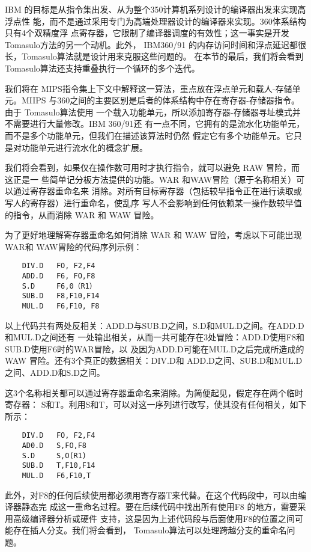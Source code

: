 IBM 的目标是从指令集出发、从为整个350计算机系列设计的编译器出发来实现高浮点性
能，而不是通过采用专门为高端处理器设计的编译器来实现。360体系结构只有4个双精度浮
点寄存器，它限制了编译器调度的有效性；这一事实是开发 Tomasulo方法的另一个动机。此外，
IBM360/91 的内存访问时间和浮点延迟都很长，Tomasulo算法就是设计用来克服这些问题的。
在本节的最后，我们将会看到 Tomasulo算法还支持重叠执行一个循环的多个迭代。

我们将在 MIPS指令集上下文中解释这一算法，重点放在浮点单元和载人-存储单元。MIIPS
与360之间的主要区别是后者的体系结构中存在寄存器-存储器指令。由于 Tomasulo算法使用
一个载入功能单元，所以添加寄存器-存储器寻址模式并不需要进行大量修改。IBM 360/91还
有一点不同，它拥有的是流水化功能单元，而不是多个功能单元，但我们在描述该算法时仍然
假定它有多个功能单元。它只是对功能单元进行流水化的概念扩展。

我们将会看到，如果仅在操作数可用时才执行指令，就可以避免 RAW 冒险，而这正是一
些简单记分板方法提供的功能。WAR 和WAW冒险（源于名称相关）可以通过寄存器重命名来
消除。对所有目标寄存器（包括较早指令正在进行读取或写人的寄存器）进行重命名，使乱序
写人不会影响到任何依赖某一操作数较早值的指令，从而消除 WAR 和 WAW 冒险。

为了更好地理解寄存器重命名如何消除 WAR 和 WAW 冒险，考虑以下可能出现 WAR和
WAW胃险的代码序列示例：

\begin{verbatim}
    DIV.D   FO, F2,F4
    ADD.D   F6, FO,F8
    S.D     F6,0（R1）
    SUB.D   F8,F10,F14
    MUL.D   F6,F10, F8
\end{verbatim}

以上代码共有两处反相关：ADD.D与SUB.D之间，S.D和MUL.D之间。在ADD.D和MUL.D之间还有
一处输出相关，从而一共可能存在3处冒险：ADD.D使用F8和SUB.D使用F6时的WAR冒险，以
及因为ADD.D可能在MUL.D之后完成所造成的WAW 冒险。还有3个真正的数据相关：DIV.D和
ADD.D之间、SUB.D和MUL.D之间、ADD.D和S.D之间。

这3个名称相关都可以通过寄存器重命名来消除。为简便起见，假定存在两个临时寄存器：
S和T。利用S和T，可以对这一序列进行改写，使其没有任何相关，如下所示：

\begin{verbatim}
    DIV.D   FO, F2,F4
    AD0.D   S,FO,F8
    S.D     S,O(R1)
    SUB.D   T,F10,F14
    MUL.D   F6,F10,T
\end{verbatim}

此外，对F8的任何后续使用都必须用寄存器T来代替。在这个代码段中，可以由编译器静态完
成这一重命名过程。要在后续代码中找出所有使用F8 的地方，需要采用高级编译器分析或硬件
支持，这是因为上述代码段与后面使用F8的位置之间可能存在插人分支。我们将会看到，
Tomasulo算法可以处理跨越分支的重命名问题。

